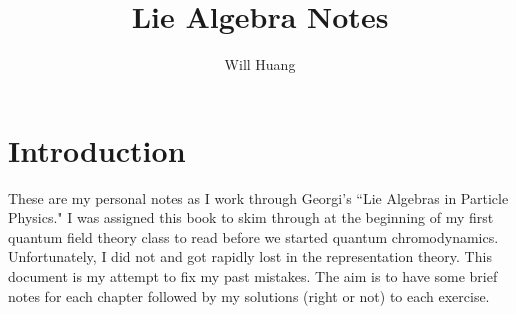 \documentclass[12pt]{article}
\begin{document}
\title{Lie Algebra Notes}
\author{Will Huang}
\maketitle
\tableofcontents

\newpage 

\section{Introduction}
These are my personal notes as I work through Georgi's ``Lie Algebras in Particle Physics." I was assigned this book to skim through at the beginning of my first quantum field theory class to read before we started quantum chromodynamics. Unfortunately, I did not and got rapidly lost in the representation theory. This document is my attempt to fix my past mistakes. The aim is to have some brief notes for each chapter followed by my solutions (right or not) to each exercise. 



\end{document}
